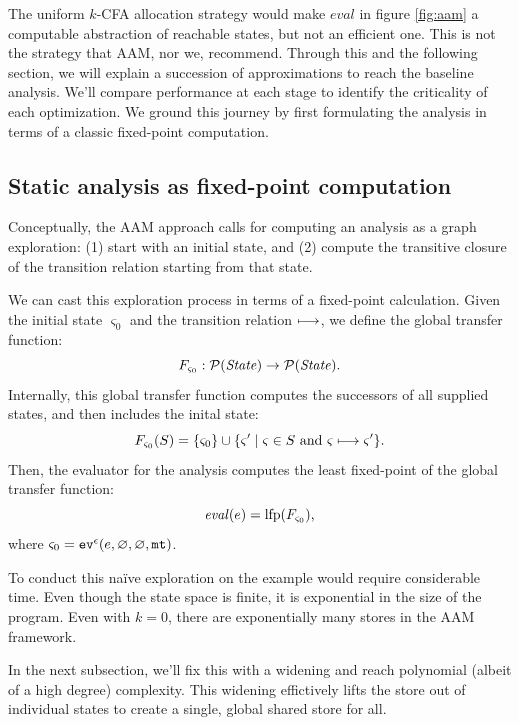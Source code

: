 \documentclass[preprint,onecolumn,9pt]{sigplanconf} %
\newcommand{\naive}{na\"ive}
\begin{document}
The uniform $k$-CFA allocation strategy would make $eval$ in figure
\ref{fig:aam} a computable abstraction of reachable states, but not an
efficient one. This is not the strategy that AAM, nor we, recommend. Through
this and the following section, we will explain a succession of approximations
to reach the baseline analysis.  We'll compare performance at each stage to
identify the criticality of each optimization. 
%
We ground this journey by first formulating the analysis in terms of a classic
fixed-point computation.


\subsection{Static analysis as fixed-point computation}
\label{sec:fixpoint}

Conceptually, the AAM approach calls for computing an analysis as a graph
exploration: (1) start with an initial state, and (2) compute the transitive
closure of the transition relation starting from that state.

We can cast this exploration process in terms of a fixed-point calculation.
%
Given the initial state $\varsigma_0$ and the transition relation $\machstep$,
we define the global transfer function:
\begin{equation*}
 F_{\varsigma_0} : \mathcal{P}(\mathit{State}) \to \mathcal{P}(\mathit{State})
 \text.
\end{equation*}
Internally, this global transfer function computes the successors of all supplied states, and then includes the inital state:
\begin{equation*}
  F_{\varsigma_0}(S) = \{ \varsigma_0 \} \cup \{ \varsigma' \mathrel{|} \varsigma \in S \text{ and } \varsigma \machstep \varsigma' \}\text. 
\end{equation*}
Then, the evaluator for the analysis computes the least fixed-point of the global transfer function:
\begin{equation*}
 \eval(e) = \mathrm{lfp}(F_{\varsigma_0})\text{,}
\end{equation*}
where $\varsigma_0 = \ev[^\mtcntr]{e, \varnothing, \varnothing, \kmt}$.


To conduct this \naive{} exploration on the \Church{} example would require
considerable time.  Even though the state space is finite, it is exponential in
the size of the program.  Even with $k = 0$, there are exponentially many
stores in the AAM framework.

In the next subsection, we'll fix this with a widening and reach polynomial
(albeit of a high degree) complexity.
%
This widening effictively lifts the store out of individual states to create
a single, global shared store for all.
\end{document}
